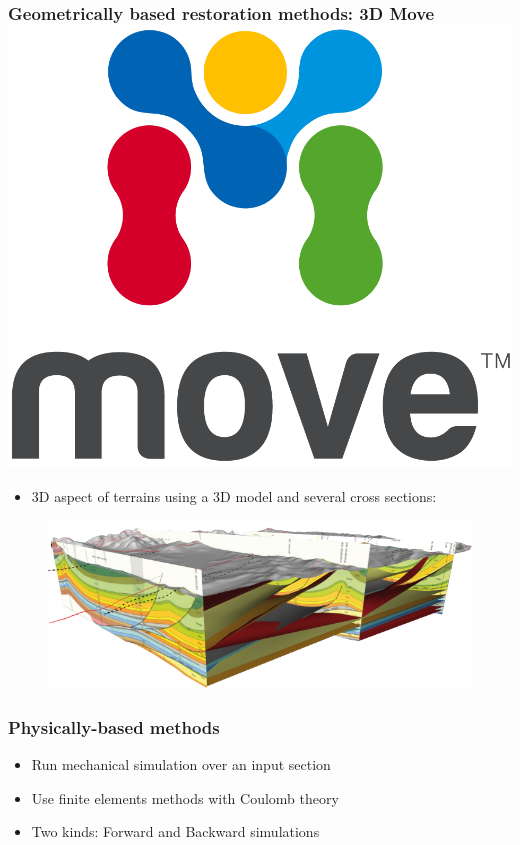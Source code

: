 \documentclass{beamer}
\begin{document}
     \begin{frame}
	\frametitle{Geometrically based restoration methods: 3D Move 
  \includegraphics[scale=0.13]{Move_logo_-01.png}}
	 \begin{itemize}
	 \item 3D aspect of terrains using a 3D model and several cross sections:
	 \end{itemize}
	 \begin{figure}[H]
	\centering
	\includegraphics[scale=1.7]{mve3D.png}
	\label{mve3}
	\end{figure}
    \end{frame}   
    
	\begin{frame}
	\frametitle{Physically-based methods}
	\begin{itemize}
	\item Run mechanical simulation over an input section
	\item Use finite elements methods with Coulomb theory
	\item Two kinds: Forward and Backward simulations
	\end{itemize}
    \end{frame}    
    
\end{document}
